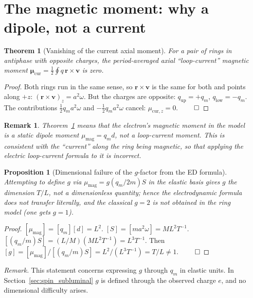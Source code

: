 \documentclass[12pt,a4paper]{article}
\newtheorem{theorem}{Theorem}
\newtheorem{proposition}{Proposition}
\newtheorem{remark}{Remark}
\begin{document}
\section{The magnetic moment: why a dipole, not a current}

\begin{theorem}[Vanishing of the current axial moment]
\label{th:mu0}
For a pair of rings in antiphase with opposite charges, the period-averaged
axial ``loop-current'' magnetic moment $\boldsymbol{\mu}_{\text{cur}}=
\tfrac12\oint q\,\mathbf{r}\times\mathbf{v}$ is zero.
\end{theorem}
\begin{proof}
Both rings run in the same sense, so $\mathbf{r}\times\mathbf{v}$ is the same
for both and points along $+z$: $(\mathbf{r}\times\mathbf{v})_z=a^2\omega$. But
the charges are opposite: $q_{\text{up}}=+q_m$, $q_{\text{low}}=-q_m$. The
contributions $\tfrac12 q_m a^2\omega$ and $-\tfrac12 q_m a^2\omega$ cancel:
$\mu_{\text{cur},z}=0$. $\qed$
\end{proof}

\begin{remark}
Theorem~\ref{th:mu0} means that the electron's magnetic moment in the model is
a \emph{static} dipole moment $\mu_{\text{mag}}=q_m d$, not a loop-current
moment. This is consistent with the ``current'' along the ring being magnetic,
so that applying the electric loop-current formula to it is incorrect.
\end{remark}

\begin{proposition}[Dimensional failure of the $g$-factor from the ED formula]
Attempting to define $g$ via $\mu_{\text{mag}}=g(q_m/2m)S$ in the elastic basis
gives $g$ the dimension $T/L$, not a dimensionless quantity; hence the
electrodynamic formula does not transfer literally, and the classical $g=2$ is
not obtained in the ring model (one gets $g=1$).
\end{proposition}
\begin{proof}
$[\mu_{\text{mag}}]=[q_m][d]=L^2$. $[S]=[m a^2\omega]=M L^2 T^{-1}$.
$[(q_m/m)S]=(L/M)(ML^2T^{-1})=L^3T^{-1}$. Then
$[g]=[\mu_{\text{mag}}]/[(q_m/m)S]=L^2/(L^3T^{-1})=T/L\neq 1$. $\qed$
\end{proof}


\noindent\textit{Remark.} This statement concerns expressing $g$ through $q_m$ in elastic units. In Section~\ref{sec:spin_subluminal} $g$ is defined through the observed charge $e$, and no dimensional difficulty arises.
\end{document}
